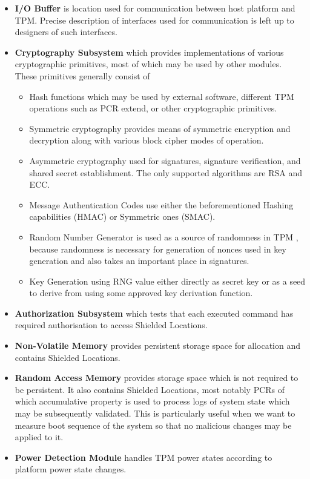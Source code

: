 \begin{itemize}

\item \textbf{I/O Buffer} is location used for communication between host platform and TPM. Precise description of interfaces used for communication is left up to designers of such interfaces.

\item \textbf{Cryptography Subsystem} which provides implementations of various cryptographic primitives, most of which may be used by other modules. These primitives generally consist of 
\begin{itemize}
    \item Hash functions which may be used by external software, different TPM operations such as PCR extend, or other cryptographic primitives. 
    \item Symmetric cryptography provides means of symmetric encryption and decryption along with various block cipher modes of operation.
    \item Asymmetric cryptography used for signatures, signature verification, and shared secret establishment. The only supported algorithms are RSA and ECC.
    \item Message Authentication Codes use either the beforementioned Hashing capabilities (HMAC) or Symmetric ones (SMAC).
    \item Random Number Generator is used as a source of randomness in TPM , because randomness is necessary for generation of nonces used in key generation and also takes an important place in signatures.
    \item Key Generation using RNG value either directly as secret key or as a seed to derive from using some approved key derivation function.
\end{itemize}

\item \textbf{Authorization Subsystem} which tests that each executed command has required authorisation to access Shielded Locations. 

\item \textbf{Non-Volatile Memory} provides persistent storage space for allocation and contains Shielded Locations.

\item \textbf{Random Access Memory} provides storage space which is not required to be persistent. It also contains Shielded Locations, most notably PCRs of which accumulative property is used to process logs of system state which may be subsequently validated. This is particularly useful when we want to measure boot sequence of the system so that no malicious changes may be applied to it.

\item \textbf{Power Detection Module} handles TPM power states according to platform power state changes.

\end{itemize}


